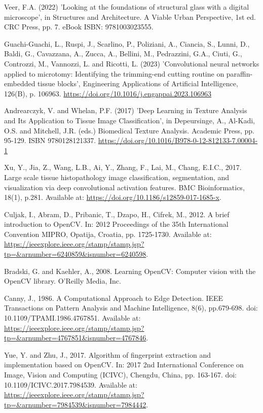 \begin{thebibliography}{99}
    Veer, F.A. (2022) 'Looking at the foundations of structural glass with a digital microscope', in Structures and Architecture. A Viable Urban Perspective, 1st ed. CRC Press, pp. 7. eBook ISBN: 9781003023555.

    Guachi-Guachi, L., Ruspi, J., Scarlino, P., Poliziani, A., Ciancia, S., Lunni, D., Baldi, G., Cavazzana, A., Zucca, A., Bellini, M., Pedrazzini, G.A., Ciuti, G., Controzzi, M., Vannozzi, L. and Ricotti, L. (2023) 'Convolutional neural networks applied to microtomy: Identifying the trimming-end cutting routine on paraffin-embedded tissue blocks', Engineering Applications of Artificial Intelligence, 126(B), p. 106963. \url{https://doi.org/10.1016/j.engappai.2023.106963}

    Andrearczyk, V. and Whelan, P.F. (2017) 'Deep Learning in Texture Analysis and Its Application to Tissue Image Classification', in Depeursinge, A., Al-Kadi, O.S. and Mitchell, J.R. (eds.) Biomedical Texture Analysis. Academic Press, pp. 95-129. ISBN 9780128121337. \url{https://doi.org/10.1016/B978-0-12-812133-7.00004-1}

    Xu, Y., Jia, Z., Wang, L.B., Ai, Y., Zhang, F., Lai, M., Chang, E.I.C., 2017. Large scale tissue histopathology image classification, segmentation, and visualization via deep convolutional activation features. BMC Bioinformatics, 18(1), p.281. Available at: \url{https://doi.org/10.1186/s12859-017-1685-x}.
    
    Culjak, I., Abram, D., Pribanic, T., Dzapo, H., Cifrek, M., 2012. A brief introduction to OpenCV. In: 2012 Proceedings of the 35th International Convention MIPRO, Opatija, Croatia, pp. 1725-1730. Available at: \url{https://ieeexplore.ieee.org/stamp/stamp.jsp?tp=&arnumber=6240859&isnumber=6240598}.

    Bradski, G. and Kaehler, A., 2008. Learning OpenCV: Computer vision with the OpenCV library. O'Reilly Media, Inc.

    Canny, J., 1986. A Computational Approach to Edge Detection. IEEE Transactions on Pattern Analysis and Machine Intelligence, 8(6), pp.679-698. doi: 10.1109/TPAMI.1986.4767851. Available at: \url{https://ieeexplore.ieee.org/stamp/stamp.jsp?tp=&arnumber=4767851&isnumber=4767846}.

    Yue, Y. and Zhu, J., 2017. Algorithm of fingerprint extraction and implementation based on OpenCV. In: 2017 2nd International Conference on Image, Vision and Computing (ICIVC), Chengdu, China, pp. 163-167. doi: 10.1109/ICIVC.2017.7984539. Available at: \url{https://ieeexplore.ieee.org/stamp/stamp.jsp?tp=&arnumber=7984539&isnumber=7984442}.


\end{thebibliography}
